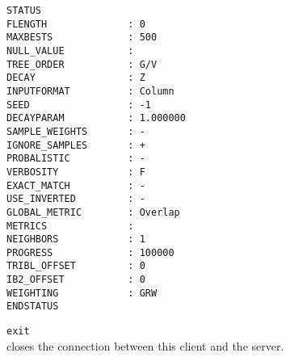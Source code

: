 \documentclass{report}
\begin{document}
\begin{description}
\begin{footnotesize}
\begin{verbatim}
STATUS
FLENGTH              : 0
MAXBESTS             : 500
NULL_VALUE           : 
TREE_ORDER           : G/V
DECAY                : Z
INPUTFORMAT          : Column
SEED                 : -1
DECAYPARAM           : 1.000000
SAMPLE_WEIGHTS       : -
IGNORE_SAMPLES       : +
PROBALISTIC          : -
VERBOSITY            : F
EXACT_MATCH          : -
USE_INVERTED         : -
GLOBAL_METRIC        : Overlap
METRICS              : 
NEIGHBORS            : 1
PROGRESS             : 100000
TRIBL_OFFSET         : 0
IB2_OFFSET           : 0
WEIGHTING            : GRW
ENDSTATUS
\end{verbatim}
\end{footnotesize}

\item {\tt exit}\\
      closes the connection between this client and the server.
\end{description}

\clearpage



\end{document}
